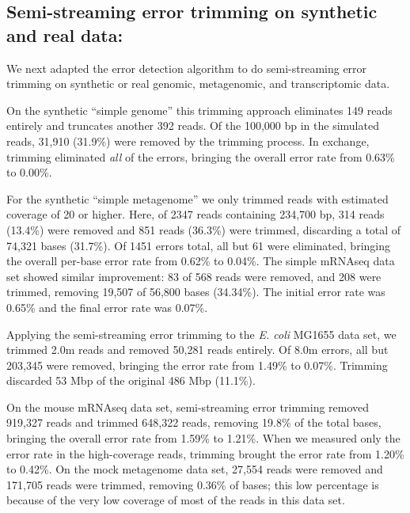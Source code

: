 % 
\subsection{Semi-streaming error trimming on synthetic and real data:}

We next adapted the error detection algorithm to do semi-streaming
error trimming on synthetic or real genomic, metagenomic, and transcriptomic data. 

On the synthetic ``simple genome'' this
trimming approach eliminates 149 reads entirely and truncates another 392
reads.  Of the 100,000 bp in the simulated reads, 31,910 (31.9\%) were removed
by the trimming process.  In exchange, trimming eliminated {\em all} of the
errors, bringing the overall error rate from 0.63\% to 0.00\%.

% 
For the synthetic ``simple metagenome'' we only trimmed reads with estimated coverage of 
20 or higher.  Here, of
2347 reads containing 234,700 bp, 314 reads (13.4\%) were removed and 851 reads
(36.3\%) were trimmed, discarding a total of 74,321 bases (31.7\%).  Of 1451
errors total, all but 61 were eliminated, bringing the overall per-base error
rate from 0.62\% to 0.04\%.  The simple mRNAseq data set showed similar
improvement: 83 of 568 reads were removed, and 208 were trimmed, removing
19,507 of 56,800 bases (34.34\%).  The initial error rate was 0.65\% and the
final error rate was 0.07\%. 



%
%
% 
Applying the semi-streaming error trimming to the {\em E. coli} MG1655 data
set, we trimmed 2.0m reads and removed 50,281 reads entirely.  Of 8.0m errors,
all but 203,345 were removed, bringing the error rate from 1.49\% to 0.07\%.
Trimming discarded 53 Mbp of the original 486 Mbp (11.1\%).

% 
% 
On the mouse mRNAseq data set, semi-streaming error trimming removed 919,327
reads and trimmed 648,322 reads, removing 19.8\% of the total bases, bringing
the overall error rate from 1.59\% to 1.21\%.  When we measured only the error
rate in the high-coverage reads, trimming brought the error rate from 1.20\% to
0.42\%.  On the mock metagenome data set, 27,554 reads were removed and 171,705
reads were trimmed, removing 0.36\% of bases; this low percentage is because of
the very low coverage of most of the reads in this data set.




